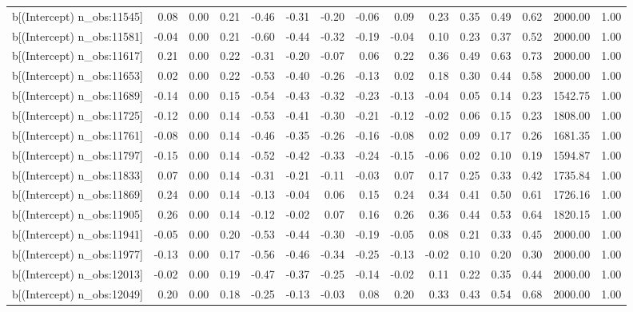 \begin{table}[ht]
\begin{tabular}{rrrrrrrrrrrrrrr}
  b[(Intercept) n\_obs:11545] & 0.08 & 0.00 & 0.21 & -0.46 & -0.31 & -0.20 & -0.06 & 0.09 & 0.23 & 0.35 & 0.49 & 0.62 & 2000.00 & 1.00 \\ 
  b[(Intercept) n\_obs:11581] & -0.04 & 0.00 & 0.21 & -0.60 & -0.44 & -0.32 & -0.19 & -0.04 & 0.10 & 0.23 & 0.37 & 0.52 & 2000.00 & 1.00 \\ 
  b[(Intercept) n\_obs:11617] & 0.21 & 0.00 & 0.22 & -0.31 & -0.20 & -0.07 & 0.06 & 0.22 & 0.36 & 0.49 & 0.63 & 0.73 & 2000.00 & 1.00 \\ 
  b[(Intercept) n\_obs:11653] & 0.02 & 0.00 & 0.22 & -0.53 & -0.40 & -0.26 & -0.13 & 0.02 & 0.18 & 0.30 & 0.44 & 0.58 & 2000.00 & 1.00 \\ 
  b[(Intercept) n\_obs:11689] & -0.14 & 0.00 & 0.15 & -0.54 & -0.43 & -0.32 & -0.23 & -0.13 & -0.04 & 0.05 & 0.14 & 0.23 & 1542.75 & 1.00 \\ 
  b[(Intercept) n\_obs:11725] & -0.12 & 0.00 & 0.14 & -0.53 & -0.41 & -0.30 & -0.21 & -0.12 & -0.02 & 0.06 & 0.15 & 0.23 & 1808.00 & 1.00 \\ 
  b[(Intercept) n\_obs:11761] & -0.08 & 0.00 & 0.14 & -0.46 & -0.35 & -0.26 & -0.16 & -0.08 & 0.02 & 0.09 & 0.17 & 0.26 & 1681.35 & 1.00 \\ 
  b[(Intercept) n\_obs:11797] & -0.15 & 0.00 & 0.14 & -0.52 & -0.42 & -0.33 & -0.24 & -0.15 & -0.06 & 0.02 & 0.10 & 0.19 & 1594.87 & 1.00 \\ 
  b[(Intercept) n\_obs:11833] & 0.07 & 0.00 & 0.14 & -0.31 & -0.21 & -0.11 & -0.03 & 0.07 & 0.17 & 0.25 & 0.33 & 0.42 & 1735.84 & 1.00 \\ 
  b[(Intercept) n\_obs:11869] & 0.24 & 0.00 & 0.14 & -0.13 & -0.04 & 0.06 & 0.15 & 0.24 & 0.34 & 0.41 & 0.50 & 0.61 & 1726.16 & 1.00 \\ 
  b[(Intercept) n\_obs:11905] & 0.26 & 0.00 & 0.14 & -0.12 & -0.02 & 0.07 & 0.16 & 0.26 & 0.36 & 0.44 & 0.53 & 0.64 & 1820.15 & 1.00 \\ 
  b[(Intercept) n\_obs:11941] & -0.05 & 0.00 & 0.20 & -0.53 & -0.44 & -0.30 & -0.19 & -0.05 & 0.08 & 0.21 & 0.33 & 0.45 & 2000.00 & 1.00 \\ 
  b[(Intercept) n\_obs:11977] & -0.13 & 0.00 & 0.17 & -0.56 & -0.46 & -0.34 & -0.25 & -0.13 & -0.02 & 0.10 & 0.20 & 0.30 & 2000.00 & 1.00 \\ 
  b[(Intercept) n\_obs:12013] & -0.02 & 0.00 & 0.19 & -0.47 & -0.37 & -0.25 & -0.14 & -0.02 & 0.11 & 0.22 & 0.35 & 0.44 & 2000.00 & 1.00 \\ 
  b[(Intercept) n\_obs:12049] & 0.20 & 0.00 & 0.18 & -0.25 & -0.13 & -0.03 & 0.08 & 0.20 & 0.33 & 0.43 & 0.54 & 0.68 & 2000.00 & 1.00 \\ 

\end{tabular}
\end{table}
